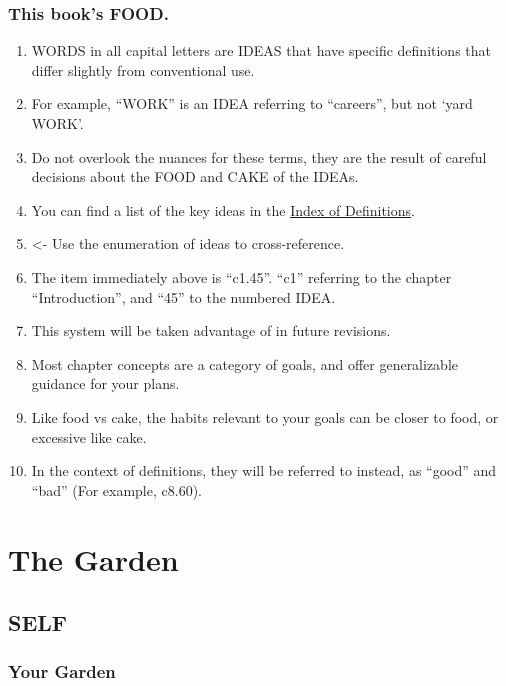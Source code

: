 \documentclass[
]{book}
\providecommand{\tightlist}{%
  \setlength{\itemsep}{0pt}\setlength{\parskip}{0pt}}
\begin{document}
\hypertarget{this-books-food.}{%
\section{This book's FOOD.}\label{this-books-food.}}

\begin{enumerate}
\def\labelenumi{\arabic{enumi}.}
\setcounter{enumi}{44}
\tightlist
\item
  WORDS in all capital letters are IDEAS that have specific definitions that differ
  slightly from conventional use.
\item
  For example, ``WORK'' is an IDEA referring to ``careers'', but not `yard WORK'.
\item
  Do not overlook the nuances for these terms, they are the result of careful decisions about the FOOD and CAKE of the IDEAs.
\item
  You can find a list of the key ideas in the \protect\hyperlink{index-of-definitions}{Index of Definitions}.
\item
  \textless- Use the enumeration of ideas to cross-reference.
\item
  The item immediately above is ``c1.45''. ``c1'' referring to the chapter ``Introduction'', and ``45'' to the numbered IDEA.
\item
  This system will be taken advantage of in future revisions.
\item
  Most chapter concepts are a category of goals, and offer generalizable guidance for your plans.
\item
  Like food vs cake, the habits relevant to your goals can be closer to food, or excessive like cake.
\item
  In the context of definitions, they will be referred to instead, as ``good'' and ``bad'' (For example, c8.60).
\end{enumerate}

\hypertarget{part-the-garden}{%
\part{The Garden}\label{part-the-garden}}

\hypertarget{self}{%
\chapter{SELF}\label{self}}

\hypertarget{your-garden}{%
\section{Your Garden}\label{your-garden}}
\end{document}
